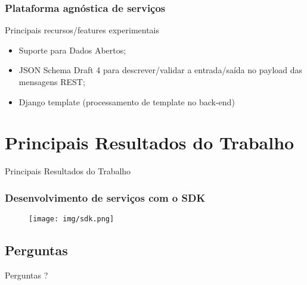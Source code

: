 \documentclass{beamer}
\begin{document}
\begin{frame}
  \frametitle{Plataforma agnóstica de serviços}

  \begin{exampleblock}{Principais recursos/features experimentais}
  
	  \begin{itemize}
 	    \item<1->Suporte para Dados Abertos;
    	    \item<1->JSON Schema Draft 4 para descrever/validar a entrada/saída no payload das mensagens REST;
	    \item<1->Django template (processamento de template no back-end)
	  \end{itemize}

  \end{exampleblock}

  
\end{frame}







\section{Principais Resultados do Trabalho}


\begin{frame}[c]{ }
\centering
  \huge{Principais Resultados do Trabalho}
\end{frame}



\begin{frame}
  \frametitle{Desenvolvimento de serviços com o SDK}

  	
	\begin{figure}
	\centering
		\texttt{[image: img/sdk.png]}
	\end{figure}
  
\end{frame}





\subsection{Perguntas}


\begin{frame}[c]{ }
\centering
  \huge{Perguntas ?}
\end{frame}
\end{document}

